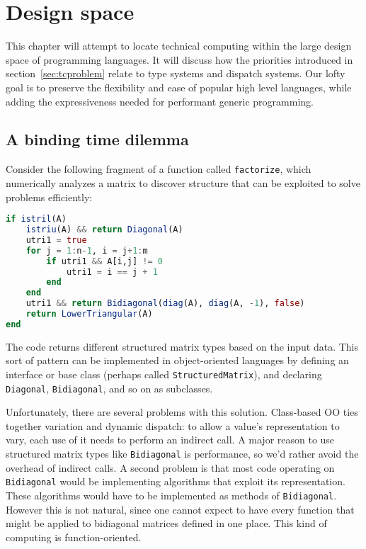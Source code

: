 \chapter{Design space}


This chapter will attempt to locate technical computing within the large
design space of programming languages.
It will discuss how the priorities introduced in section~\ref{sec:tcproblem}
relate to type systems and dispatch systems.
Our lofty goal is to preserve the flexibility and ease of popular high level
languages, while adding the expressiveness needed for performant generic
programming.


\section{A binding time dilemma}
\label{sec:bindingtimedilemma}

Consider the following fragment of a function called \texttt{factorize},
which numerically analyzes a matrix to discover structure that
can be exploited to solve problems efficiently:

\begin{singlespace}
\begin{lstlisting}[language=julia]
if istril(A)
    istriu(A) && return Diagonal(A)
    utri1 = true
    for j = 1:n-1, i = j+1:m
        if utri1 && A[i,j] != 0
            utri1 = i == j + 1
        end
    end
    utri1 && return Bidiagonal(diag(A), diag(A, -1), false)
    return LowerTriangular(A)
end
\end{lstlisting}
\end{singlespace}

\noindent
The code returns different structured matrix types based on the input
data.
This sort of pattern can be implemented in object-oriented languages
by defining an interface or base class (perhaps called \texttt{StructuredMatrix}),
and declaring \texttt{Diagonal}, \texttt{Bidiagonal}, and so on as
subclasses.

Unfortunately, there are several problems with this solution.
Class-based OO ties together variation and dynamic dispatch: to allow
a value's representation to vary, each use of it needs to perform an
indirect call.
A major reason to use structured matrix types like \texttt{Bidiagonal}
is performance, so we'd rather avoid the overhead of indirect calls.
A second problem is that most code operating on \texttt{Bidiagonal} would
be implementing algorithms that exploit its representation.
These algorithms would have to be implemented as methods of
\texttt{Bidiagonal}.
However this is not natural, since one cannot expect to have every
function that might be applied to bidiagonal matrices defined in
one place.
This kind of computing is function-oriented.

